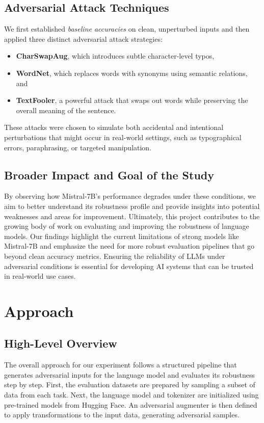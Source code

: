 \documentclass[conference]{IEEEtran}
\begin{document}
\subsection{Adversarial Attack Techniques}

We first established \textit{baseline accuracies} on clean, unperturbed inputs and then applied three distinct adversarial attack strategies:
\begin{itemize}
    \item \textbf{CharSwapAug}, which introduces subtle character-level typos,
    \item \textbf{WordNet}, which replaces words with synonyms using semantic relations, and
    \item \textbf{TextFooler}, a powerful attack that swaps out words while preserving the overall meaning of the sentence.
\end{itemize}
These attacks were chosen to simulate both accidental and intentional perturbations that might occur in real-world settings, such as typographical errors, paraphrasing, or targeted manipulation.

\subsection{Broader Impact and Goal of the Study}

By observing how Mistral-7B’s performance degrades under these conditions, we aim to better understand its robustness profile and provide insights into potential weaknesses and areas for improvement. Ultimately, this project contributes to the growing body of work on evaluating and improving the robustness of language models. Our findings highlight the current limitations of strong models like Mistral-7B and emphasize the need for more robust evaluation pipelines that go beyond clean accuracy metrics. Ensuring the reliability of LLMs under adversarial conditions is essential for developing AI systems that can be trusted in real-world use cases.



\section{Approach}

\subsection{High-Level Overview}

The overall approach for our experiment follows a structured pipeline that generates adversarial inputs for the language model and evaluates its robustness step by step. First, the evaluation datasets are prepared by sampling a subset of data from each task. Next, the language model and tokenizer are initialized using pre-trained models from Hugging Face. An adversarial augmenter is then defined to apply transformations to the input data, generating adversarial samples.
\end{document}
